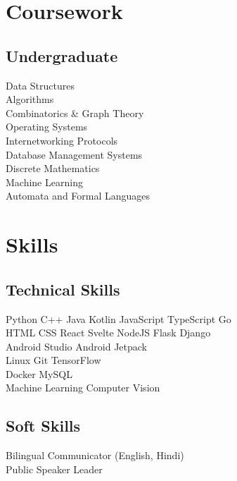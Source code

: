 \documentclass[]{deedy-resume-openfont}
\begin{document}
\begin{minipage}[t]{0.30\textwidth}
\section{Coursework}

\subsection{Undergraduate}
Data Structures \\
Algorithms \\
Combinatorics \& Graph Theory \\
Operating Systems \\
Internetworking Protocols \\
Database Management Systems \\
Discrete Mathematics \\
Machine Learning \\
Automata and Formal Languages \\

\section{Skills}
\subsection{Technical Skills}
Python \textbullet{} C++ \textbullet{} Java \textbullet{} Kotlin \textbullet{} JavaScript \textbullet{} TypeScript \textbullet{} Go \\
\vspace{2mm}
HTML \textbullet{} CSS \textbullet{} React \textbullet{} Svelte \textbullet{} NodeJS \textbullet{} Flask \textbullet{} Django \\
\vspace{2mm}
Android Studio \textbullet{} Android Jetpack \\
\vspace{2mm}
Linux \textbullet{} Git \textbullet{} TensorFlow \textbullet{} \\ Docker \textbullet{} MySQL \\
\vspace{2mm}
Machine Learning \textbullet{} Computer Vision
\sectionsep

\subsection{Soft Skills}
Bilingual Communicator (English, Hindi) \\
Public Speaker \textbullet{} Leader

\end{minipage}
\end{document}
